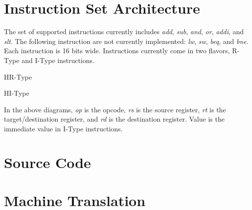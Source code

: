 \documentclass{article}
\newenvironment{problem}[1]{
  \nobreak\section*{#1}
}{}
\begin{document}
  \begin{problem}{Instruction Set Architecture}
    The set of supported instructions currently includes \emph{add},
    \emph{sub}, \emph{and}, \emph{or}, \emph{addi}, and \emph{slt}.
    The following instruction are not currently implemented: \emph{lw},
    \emph{sw}, \emph{beq}, and \emph{bne}.  Each instruction is 16
    bits wide.  Instructions currently come in two flavors, R-Type and
    I-Type instructions.

    \begin{register}{H}{R-Type}{}
      \begin{center}
      \end{center}
    \end{register}

    \begin{register}{H}{I-Type}{}
      \begin{center}
      \end{center}
    \end{register}

    In the above diagrams, \emph{op} is the opcode, \emph{rs} is the
    source register, \emph{rt} is the target/destination register, and
    \emph{rd} is the destination register.  Value is the immediate value
    in I-Type instructions.

    \begin{problem}{Source Code}
      
    \end{problem}

    \begin{problem}{Machine Translation}
      
    \end{problem}


\end{problem}
\end{document}
